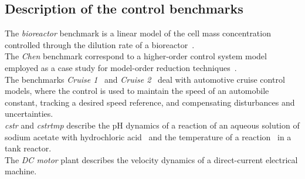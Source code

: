 \subsection{Description of the control benchmarks}
\label{exp:benchmarks}

The \textit{bioreactor} benchmark is a linear model 
of the cell mass concentration controlled through the dilution rate of a bioreactor~\cite{bioreactor}.\\ 
%
The \textit{Chen}
benchmark correspond to a higher-order control system 
model employed as a case study for model-order reduction techniques~\cite{CHEN1979389}.  \\
%
The benchmarks \textit{Cruise 1}~\cite{Franklin15} and \textit{Cruise 2}~\cite{Astrom08} deal with automotive cruise control models, 
where the control is used to maintain the speed of an automobile constant, 
tracking a desired speed reference, and compensating disturbances and uncertainties. \\ %
\textit{cstr}  and \textit{cstrtmp}  describe the pH dynamics of a reaction 
of an aqueous solution of sodium acetate with hydrochloric acid~\cite{cstr} and 
the temperature of a reaction~\cite{astrom2006advanced} in a 
tank reactor. \\ 
The \textit{DC motor} plant  describes the velocity 
dynamics of a 
direct-current electrical machine. \\ 
%
